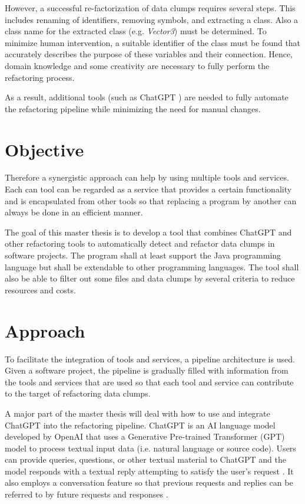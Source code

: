 However, a successful re-factorization of data clumps requires several steps. This includes renaming of identifiers, removing symbols, and extracting a class. Also a class name for the extracted class (e.g. \textit{Vector3}) must be determined. To minimize human intervention, a suitable identifier of the class must be found that accurately describes the purpose of these variables and their connection. Hence, domain knowledge and some creativity are necessary to fully perform the refactoring process.

As a result,  additional tools (such as ChatGPT \cite{ChatGPT_url}) are needed to fully automate the refactoring pipeline while minimizing the need for manual changes. 




\section{Objective}
Therefore a synergistic approach can help by using multiple tools and services.  Each can tool can be regarded as  a service that provides a certain functionality and is encapsulated from other tools so that replacing a program by another can always be done in an efficient manner. 


The goal of this master thesis is to develop a tool that  combines ChatGPT and other refactoring tools  to automatically detect and refactor data clumps in software projects. The program  shall at least support the Java programming language but shall be extendable to  other programming languages. The tool shall also  be able to filter out some files and data clumps by several criteria to reduce resources and costs. 



\section{Approach}

To facilitate the integration of tools and services, a pipeline architecture is used. Given a software project, the pipeline is gradually filled with information from the tools and services that are used so that each tool and service can contribute to the target of refactoring data clumps.

A major part of the master thesis will deal with how to use and integrate ChatGPT into the refactoring pipeline. 
ChatGPT is an AI language model developed by OpenAI that uses a Generative Pre-trained Transformer (GPT) model to process textual input data (i.e. natural language or source code). Users can provide queries, questions, or other textual material to ChatGPT and the model responds with a textual reply attempting to satisfy the user's request \cite{yetistirenEvaluatingCodeQuality2023}. It also employs a conversation feature so that previous requests and replies can be referred to by future requests and responses \cite{sobania2023analysis}.

